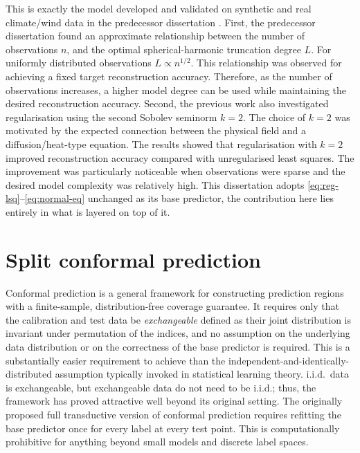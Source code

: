 \documentclass[11pt,a4paper]{report}
\begin{document}
This is exactly the model developed and validated on synthetic and real climate/wind data in the predecessor dissertation \citep{thomas2025}. First, the predecessor dissertation found an approximate relationship between the number of observations $n$, and the optimal spherical-harmonic truncation degree $L$. For uniformly distributed observations $L \propto n^{1/2}$. This relationship was observed for achieving a fixed target reconstruction accuracy. Therefore, as the number of observations increases, a higher model degree can be used while maintaining the desired reconstruction accuracy. Second, the previous work also investigated regularisation using the second Sobolev seminorm $k=2$. The choice of $k=2$ was motivated by the expected connection between the physical field and a diffusion/heat-type equation. The results showed that regularisation with $k=2$ improved reconstruction accuracy compared with unregularised least squares. The improvement was particularly noticeable when observations were sparse and the desired model complexity was relatively high. This dissertation adopts \cref{eq:reg-lsq}--\cref{eq:normal-eq} unchanged as its base predictor, the contribution here lies entirely in what is layered on top of it.
 
\section{Split conformal prediction}
\label{sec:cp-background}

Conformal prediction \citep{vovk2005} is a general framework for constructing prediction regions with a finite-sample, distribution-free coverage guarantee. It requires only that the calibration and test data be \emph{exchangeable} defined as their joint distribution is invariant under permutation of the indices, and no assumption on the underlying data distribution or on the correctness of the base predictor is required. This is a substantially easier requirement to achieve than the independent-and-identically-distributed assumption typically invoked in statistical learning theory. i.i.d.\ data is exchangeable, but exchangeable data do not need to be i.i.d.; thus, the framework has proved attractive well beyond its original setting. The originally proposed full transductive version of conformal prediction requires refitting the base predictor once for every label at every test point. This is computationally prohibitive for anything beyond small models and discrete label spaces.
\end{document}
